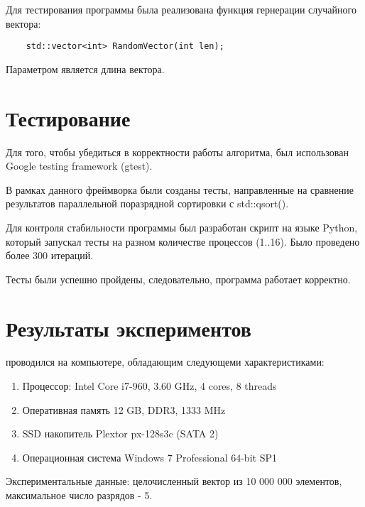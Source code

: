\documentclass{report}
\begin{document}
    \par Для тестирования программы была реализована функция гернерации случайного вектора:
    \begin{lstlisting}
    std::vector<int> RandomVector(int len);
    \end{lstlisting}
    Параметром является длина вектора.
    
    \newpage
    \section*{Тестирование}
    \par Для того, чтобы убедиться в корректности работы алгоритма, был использован Google testing framework (gtest).
    \par В рамках данного фреймворка были созданы тесты, направленные на сравнение результатов параллельной поразрядной сортировки с std::qsort().
    \par Для контроля стабильности программы был разработан скрипт на языке Python, который запускал тесты на разном количестве процессов (1..16). Было проведено более 300 итераций.
    \par Тесты были успешно пройдены, следовательно, программа работает корректно.
    
    \newpage
    \section*{Результаты экспериментов}
    
     проводился на компьютере, обладающим следующеми характеристиками:
    \begin{enumerate}
        \item Процессор: Intel Core i7-960, 3.60 GHz, 4 cores, 8 threads
        \item Оперативная память 12 GB, DDR3, 1333 MHz
        \item SSD накопитель Plextor px-128s3c (SATA 2)
        \item Операционная система Windows 7 Professional 64-bit SP1
    \end{enumerate}
    
    Экспериментальные данные: целочисленный вектор из 10 000 000 элементов, максимальное число разрядов - 5.
    
\end{document}
